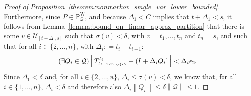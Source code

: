 \documentclass[10pt,a4paper]{paper}
\theoremstyle{definition}
\newcommand{\states}{\mathcal{X}}
\newcommand{\processes}{\mathbb{P}}
\newcommand{\wprocesses}{\processes^{\mathrm{W}}}
\newcommand{\gambles}{\mathcal{L}}
\newcommand{\gamblesX}{\gambles(\states)}
\newcommand{\rateset}{\mathcal{Q}}
\newcommand{\lrate}{\underline{Q}}
\newcommand{\norm}[1]{\left\lVert #1 \right\rVert}
\newcommand{\coloneqq}{:\!=}
\begin{document}
\begin{proof}[Proof of Proposition~\ref{theorem:nonmarkov_single_var_lower_bounded}]
Furthermore, since $P\in\wprocesses_\rateset$, and because $\Delta_1<C$ implies that $t+\Delta_1<s$, it follows from Lemma~\ref{lemma:bound_on_linear_approx_partition} that there is some $v\in\mathcal{U}_{[t+\Delta_1,s]}$ such that $\sigma(v)<\delta$, with $v=t_1,\ldots,t_n$ and $t_n=s$, and such that for all $i\in\{2,\ldots,n\}$, with $\Delta_i\coloneqq t_i-t_{i-1}$:
\begin{equation*}
(\exists Q_i\in\rateset)\norm{T_{t_{i-1},x_{u\cup \{t\}}}^{t_{i}} - (I+\Delta_{i}Q_i)} < \Delta_{i}\epsilon_2.\vspace{5pt}
\end{equation*}
Since $\Delta_1<\delta$ and, for all $i\in\{2,\dots,n\}$, $\Delta_i\leq\sigma(v)<\delta$, we know that, for all $i\in\{1,\dots,n\}$, $\Delta_i<\delta$ and therefore also $\Delta_i\norm{Q_i}\leq\delta\norm{\rateset}\leq1$.

\end{proof}
\end{document}
